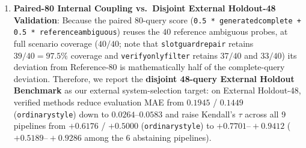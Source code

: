 \documentclass[10pt,twocolumn]{article}
\renewcommand{\_}{\textunderscore\allowbreak}
\begin{document}
\begin{enumerate}[leftmargin=*,nosep]
  \item \textbf{Paired-80 Internal Coupling vs.\ Disjoint External Holdout-48 Validation}: Because the paired 80-query score (\texttt{0.5 * generated\_complete + 0.5 * reference\_ambiguous}) reuses the $40$ reference ambiguous probes, at full scenario coverage ($40/40$; note that \texttt{slot\_guard\_repair} retains $39/40 = 97.5\%$ coverage and \texttt{verify\_only\_filter} retains $37/40$ and $33/40$) its deviation from Reference-80 is mathematically half of the complete-query deviation. Therefore, we report the \textbf{disjoint 48-query External Holdout Benchmark} as our external system-selection target: on External Holdout-48, verified methods reduce evaluation MAE from $0.1945$ / $0.1449$ (\texttt{ordinary\_style}) down to $0.0264\text{--}0.0583$ and raise Kendall's $\tau$ across all 9 pipelines from $+0.6176$ / $+0.5000$ (\texttt{ordinary\_style}) to $+0.7701\text{--}+0.9412$ ($+0.5189\text{--}+0.9286$ among the 6 abstaining pipelines).
\end{enumerate}
\end{document}
